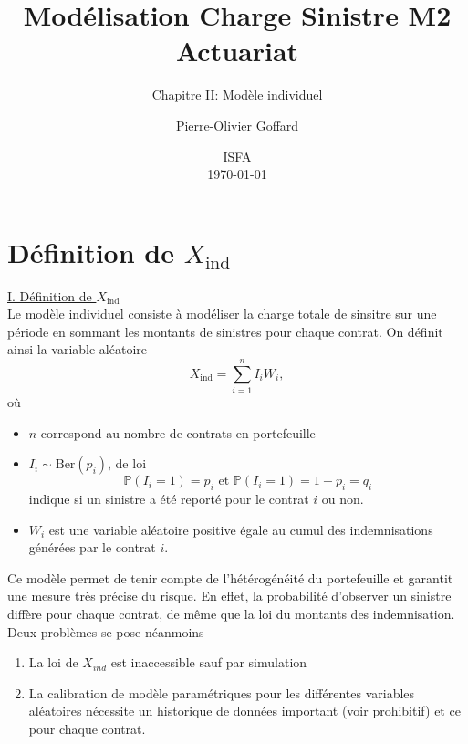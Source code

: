 \documentclass[8pt,notheorems]{beamer}
\title[]{Modélisation Charge Sinistre M2 Actuariat}
\subtitle{Chapitre II: Modèle individuel}
\author{Pierre-Olivier Goffard}
\institute{
	   Université de Lyon 1\\
	ISFA\\
	   \texttt{pierre-olivier.goffard@univ-lyon1.fr}
	  }
\date{
ISFA\\
\today}
\def \P {\mathbb P}
\theoremstyle{definition}
\theoremstyle{example}
\theoremstyle{mystyle}
\theoremstyle{plain}
\begin{document}
\frame{\titlepage}


\section{Définition de $X_{\text{ind}}$}
\begin{frame}[allowframebreaks]
\underline{I. Définition de $X_{\text{ind}}$}\\
Le modèle individuel consiste à modéliser la charge totale de sinsitre sur une période en sommant les montants de sinistres pour chaque contrat. On définit ainsi la variable aléatoire 
\begin{equation}\label{eq:modele_individuel}
X_{\text{ind}} = \sum_{i = 1}^{n}I_iW_i,
\end{equation}
où
\begin{itemize}
    \item $n$ correspond au nombre de contrats en portefeuille
    \item $I_i\sim\text{Ber}(p_i)$, de loi 
    $$
    \P(I_i = 1) = p_i\text{ et }\P(I_i = 1) = 1-p_i = q_i
    $$
    indique si un sinistre a été reporté pour le contrat $i$ ou non.
    \item $W_i$ est une variable aléatoire positive égale au cumul des indemnisations générées par le contrat $i$.
\end{itemize}
Ce modèle permet de tenir compte de l'hétérogénéité du portefeuille et garantit une mesure très précise du risque. En effet, la probabilité d'observer un sinistre diffère pour chaque contrat, de même que la loi du montants des indemnisation. Deux problèmes se pose néanmoins
\begin{enumerate}
    \item La loi de $X_{ind}$ est inaccessible sauf par simulation
    \item La calibration de modèle paramétriques pour les différentes variables aléatoires nécessite un historique de données important (voir prohibitif) et ce pour chaque contrat.
\end{enumerate}
\end{frame}
\end{document}
